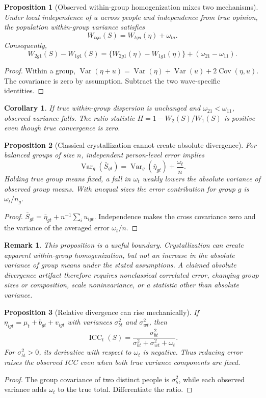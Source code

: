 \documentclass[11pt]{article}
\newtheorem{proposition}{Proposition}
\newtheorem{corollary}{Corollary}
\newtheorem{remark}{Remark}
\newcommand{\Var}{\operatorname{Var}}
\newcommand{\Cov}{\operatorname{Cov}}
\begin{document}
\begin{proposition}[Observed within-group homogenization mixes two mechanisms]
Under local independence of $u$ across people and independence from true opinion,
the population within-group variance satisfies
\[
W_{tga}(S)=W_{tga}(\eta)+\omega_{ta}.
\]
Consequently,
\[
W_{2g1}(S)-W_{1g1}(S)
=\{W_{2g1}(\eta)-W_{1g1}(\eta)\}+(\omega_{21}-\omega_{11}).
\]
\end{proposition}
\begin{proof}
Within a group, $\Var(\eta+u)=\Var(\eta)+\Var(u)+2\Cov(\eta,u)$.
The covariance is zero by assumption. Subtract the two wave-specific identities.
\end{proof}

\begin{corollary}
If true within-group dispersion is unchanged and $\omega_{21}<\omega_{11}$,
observed variance falls. The ratio statistic
$H=1-W_2(S)/W_1(S)$ is positive even though true convergence is zero.
\end{corollary}

\begin{proposition}[Classical crystallization cannot create absolute divergence]
For balanced groups of size $n$, independent person-level error implies
\[
\Var_g(\bar S_{gt})=\Var_g(\bar\eta_{gt})+\frac{\omega_t}{n}.
\]
Holding true group means fixed, a fall in $\omega_t$ weakly lowers the absolute
variance of observed group means. With unequal sizes the error contribution for
group $g$ is $\omega_t/n_g$.
\end{proposition}
\begin{proof}
$\bar S_{gt}=\bar\eta_{gt}+n^{-1}\sum_i u_{igt}$. Independence makes the cross
covariance zero and the variance of the averaged error $\omega_t/n$.
\end{proof}

\begin{remark}
This proposition is a useful boundary. Crystallization can create apparent
within-group homogenization, but not an increase in the absolute variance of
group means under the stated assumptions. A claimed absolute divergence artifact
therefore requires nonclassical correlated error, changing group sizes or
composition, scale noninvariance, or a statistic other than absolute variance.
\end{remark}

\begin{proposition}[Relative divergence can rise mechanically]
If $\eta_{igt}=\mu_t+b_{gt}+v_{igt}$ with variances $\sigma^2_{bt}$ and
$\sigma^2_{wt}$, then
\[
\operatorname{ICC}_t(S)=
\frac{\sigma^2_{bt}}{\sigma^2_{bt}+\sigma^2_{wt}+\omega_t}.
\]
For $\sigma^2_{bt}>0$, its derivative with respect to $\omega_t$ is negative.
Thus reducing error raises the observed ICC even when both true variance
components are fixed.
\end{proposition}
\begin{proof}
The group covariance of two distinct people is $\sigma_b^2$, while each observed
variance adds $\omega_t$ to the true total. Differentiate the ratio.
\end{proof}
\end{document}
